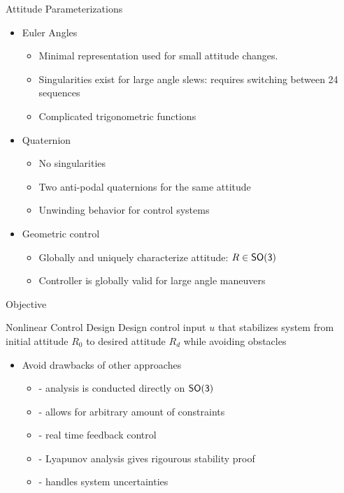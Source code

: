 \begin{frame}{Attitude Parameterizations}
    \begin{itemize}
        \item Euler Angles
        \begin{itemize}
            \item Minimal representation used for small attitude changes.
            \item Singularities exist for large angle slews: requires switching between 24 sequences
            \item Complicated trigonometric functions
        \end{itemize}
        \pause
        \item Quaternion 
        \begin{itemize}
            \item No singularities
            \item Two anti-podal quaternions for the same attitude
            \item Unwinding behavior for control systems
        \end{itemize}
        \pause
        \item Geometric control
        \begin{itemize}
            \item Globally and uniquely characterize attitude: \( R \in \mathsf{SO(3)} \)
            \item Controller is globally valid for large angle maneuvers
        \end{itemize}
    \end{itemize}
    
\end{frame}

\begin{frame}{Objective} %

    \begin{block}{Nonlinear Control Design}
        Design control input \( u \) that stabilizes system from initial attitude \( R_0 \) to desired attitude \( R_d \) while avoiding obstacles
    \end{block}
    \pause
    \begin{itemize}
        \item Avoid drawbacks of other approaches 
        \begin{itemize}
            \item {} - analysis is conducted directly on \( \mathsf{SO(3)} \) 
            \item {} - allows for arbitrary amount of constraints
            \item {} - real time feedback control
            \item {} - Lyapunov analysis gives rigourous stability proof
            \item {} - handles system uncertainties
        \end{itemize}
    \end{itemize}
\end{frame}


